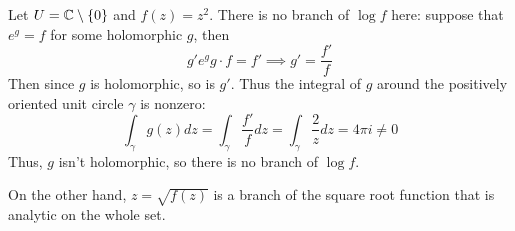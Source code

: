 \documentclass{homework}
\begin{document}
                                                                                                                                                  \begin{solution}
                                                                                                                                                  Let $U = \mathbb{C} \setminus \{0\}$ and $f(z) = z^2$. There is no branch of $\log f$ here: suppose that $e^g = f$ for some holomorphic $g$, then 
                                                                                                                                                  \[
                                                                                                                                                  g'e^{g} g\cdot f= f' \implies g' = \frac{f'}{f}
                                                                                                                                                  \]
                                                                                                                                                  Then since $g$ is holomorphic, so is $g'$. Thus the integral of $g$ around the positively oriented unit circle $\gamma$ is nonzero:
                                                                                                                                                  \[
                                                                                                                                                  \int_\gamma g(z) dz =\int_\gamma \frac{f'}{f} dz = \int_\gamma \frac{2}{z} dz = 4\pi i \neq 0
                                                                                                                                                  \]
                                                                                                                                                  Thus, $g$ isn't holomorphic, so there is no branch of $\log f$.

                                                                                                                                                  On the other hand, $z = \sqrt{f(z)}$ is a branch of the square root function that is analytic on the whole set.
                                                                                                                                                  \end{solution}
\end{document}

